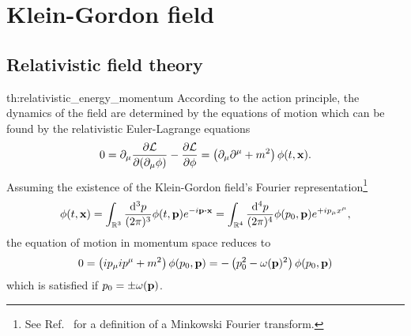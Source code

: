 \section{Klein-Gordon field}

\subsection{Relativistic field theory}

\begin{delayedproof}{th:relativistic_energy_momentum}
	According to the action principle, the dynamics of the field are determined by the equations of motion which can be found by the relativistic Euler-Lagrange equations
	\begin{equation*}
		0
		=
		\partial_\mu\pdv{\mathcal{L}}{(\partial_\mu\phi)}
		-
		\pdv{\mathcal{L}}{\phi}
		=
		\left(
			\partial_\mu\partial^\mu
			+
			m^2
		\right)
		\phi(t,\vb{x})
		.
	\end{equation*}
	Assuming the existence of the Klein-Gordon field's Fourier representation\footnote{See Ref.~\cite[p.~341]{Cohen2019} for a definition of a Minkowski Fourier transform.}
	\begin{equation*}
		\phi(t,\vb{x})
		=
		\int_{\mathbb{R}^3}\frac{\dd[3]{p}}{(2\pi)^3}
		\phi(t,\vb{p})
		e^{-i\vb{p}\vdot\vb{x}}
		=
		\int_{\mathbb{R}^4}\frac{\dd[4]{p}}{(2\pi)^4}
		\phi(p_0,\vb{p})
		e^{+ip_\mu x^\mu}
		,
	\end{equation*}
	the equation of motion in momentum space reduces to
	\begin{equation*}
		0
		=
		\left(
			ip_\mu ip^\mu
			+
			m^2
		\right)
		\phi(p_0,\vb{p})
		=
		-
		\left(
			p_0^2
			-
			\omega(\vb{p})^2
		\right)
		\phi(p_0,\vb{p})
	\end{equation*}
	which is satisfied if $p_0=\pm\omega(\vb{p})$.
\end{delayedproof}
